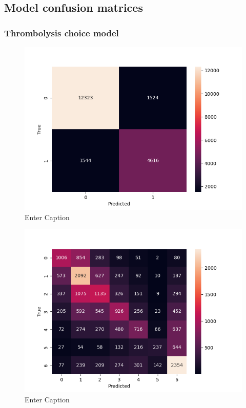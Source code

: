 \subsection{Model confusion matrices}

\subsubsection{Thrombolysis choice model}


\begin{figure}
    \centering
    \includegraphics[width=0.75\linewidth]{images/confusion_matrix_choice}
    \caption{Enter Caption}
    \label{fig:confusion_choice}
\end{figure}

\begin{figure}
    \centering
    \includegraphics[width=0.75\linewidth]{images/confusion_matrix_outcome}
    \caption{Enter Caption}
    \label{fig:confusion_outcome}
\end{figure}


